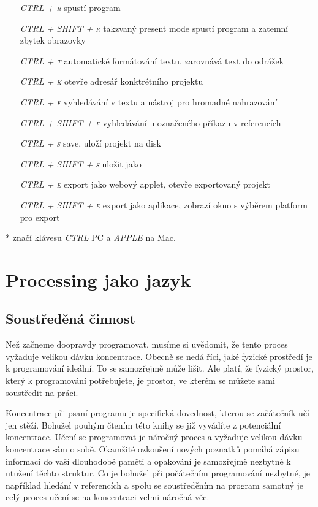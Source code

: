 \documentclass[10pt]{book}
\newcommand{\oddil}[1]{\section{#1}\index{#1}\label{#1}}
\newcommand{\klavesy}[1]{\textsc{\em #1}}
\begin{document}
\begin{itemize}
\item[\klavesy{CTRL + r}]  spustí program
\item[\klavesy{CTRL + SHIFT + r}] takzvaný present mode spustí program a zatemní zbytek obrazovky
\item[\klavesy{CTRL + t}] automatické formátování textu, zarovnává text do odrážek
\item[\klavesy{CTRL + k}] otevře adresář konktrétního projektu
\item[\klavesy{CTRL + f}] vyhledávání v textu a nástroj pro hromadné nahrazování
\item[\klavesy{CTRL + SHIFT + f}] vyhledávání u označeného příkazu v referencích
\item[\klavesy{CTRL + s}] save, uloží projekt na disk
\item[\klavesy{CTRL + SHIFT + s}] uložit jako

\item[\klavesy{CTRL + e}] export jako webový applet, otevře exportovaný projekt
\item[\klavesy{CTRL + SHIFT + e}] export jako aplikace, zobrazí okno s výběrem platform pro export

\end{itemize}

* značí klávesu \klavesy{CTRL} PC a \klavesy{APPLE} na Mac.


\chapter{Processing jako jazyk}

\oddil{Soustředěná činnost}

Než začneme doopravdy programovat, musíme si uvědomit, že tento proces vyžaduje velikou dávku koncentrace. Obecně se nedá říci, jaké fyzické prostředí je k programování ideální. To se samozřejmě může lišit. Ale platí, že fyzický prostor, který k programování potřebujete, je prostor, ve kterém se můžete sami soustředit na práci.

Koncentrace při psaní programu je specifická dovednost, kterou se začátečník učí jen stěží. Bohužel pouhým čtením této knihy se již vyvádíte z potenciální koncentrace. Učení se programovat je náročný proces a vyžaduje velikou dávku koncentrace sám o sobě. Okamžité ozkoušení nových poznatků pomáhá zápisu informací do vaší dlouhodobé paměti a opakování je samozřejmě nezbytné k utužení těchto struktur. Co je bohužel při počátečním programování nezbytné, je například hledání v referencích a spolu se soustředěním na program samotný je celý proces učení se na koncentraci velmi náročná věc.
\end{document}
